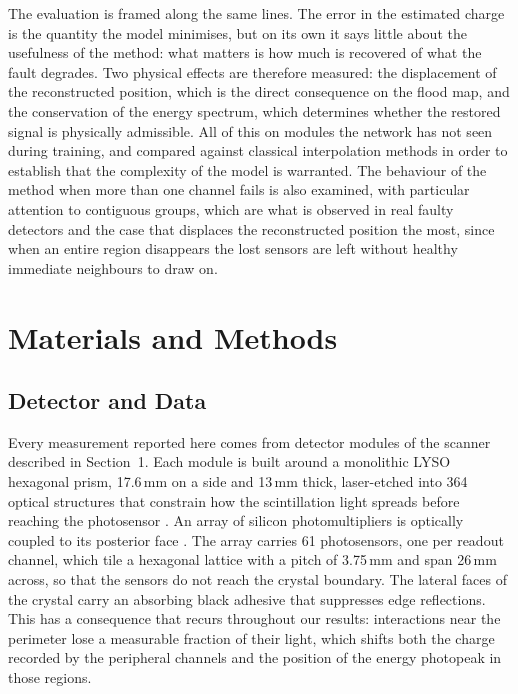 \documentclass[10pt,conference]{IEEEtran}
\begin{document}
The evaluation is framed along the same lines. The error in the estimated
charge is the quantity the model minimises, but on its own it says little
about the usefulness of the method: what matters is how much is recovered of
what the fault degrades. Two physical effects are therefore measured: the
displacement of the reconstructed position, which is the direct consequence
on the flood map, and the conservation of the energy spectrum, which
determines whether the restored signal is physically admissible. All of this
on modules the network has not seen during training,
and compared against classical interpolation methods in order to establish
that the complexity of the model is warranted. The behaviour of the method
when more than one channel fails is also examined, with particular attention
to contiguous groups, which are what is observed in real faulty detectors
and the case that displaces the reconstructed position the most, since when an
entire region disappears the lost sensors are left without healthy immediate
neighbours to draw on.

\section{Materials and Methods}

\subsection{Detector and Data}
\label{sec:detector}

Every measurement reported here comes from detector modules of the scanner
described in Section~1. Each module is built around a monolithic LYSO hexagonal
prism, 17.6\,mm on a side and 13\,mm thick, laser-etched into 364 optical
structures that constrain how the scintillation light spreads before reaching
the photosensor \cite{perez-benito_laser-microstructured_2025}. An array of
silicon photomultipliers is optically coupled to its posterior face
\cite{perez-benito_sipm-based_2019}. The array carries 61 photosensors, one per
readout channel, which tile a hexagonal lattice with a pitch of 3.75\,mm and span
26\,mm across, so that the sensors do not reach the crystal boundary. The lateral faces of the crystal carry an absorbing black adhesive
that suppresses edge reflections. This has a consequence that recurs
throughout our results: interactions near the perimeter lose a measurable
fraction of their light, which shifts both the charge recorded by the peripheral
channels and the position of the energy photopeak in those regions.
\end{document}
